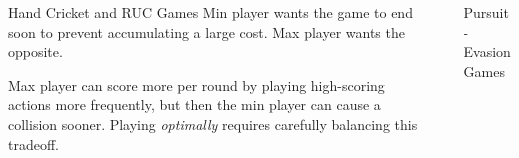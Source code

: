 \documentclass[final,20pt]{beamer}
\newlength{\sepwidth}
\newlength{\colwidth}
\newcommand{\separatorcolumn}{\begin{column}{\sepwidth}\end{column}}
\begin{document}
\begin{frame}[t]
\begin{columns}[t]
\begin{column}{\colwidth}
\begin{block}{Hand Cricket and RUC Games}
Min player wants the game to end soon to prevent accumulating a large cost.
Max player wants the opposite.

Max player can score more per round by playing high-scoring actions more frequently,
but then the min player can cause a collision sooner.
Playing \emph{optimally} requires carefully balancing this tradeoff.

\end{block}

\end{column}

\separatorcolumn

\begin{column}{\colwidth}

\begin{block}{Pursuit-Evasion Games}


\end{block}
\end{column}
\end{columns}
\end{frame}
\end{document}
